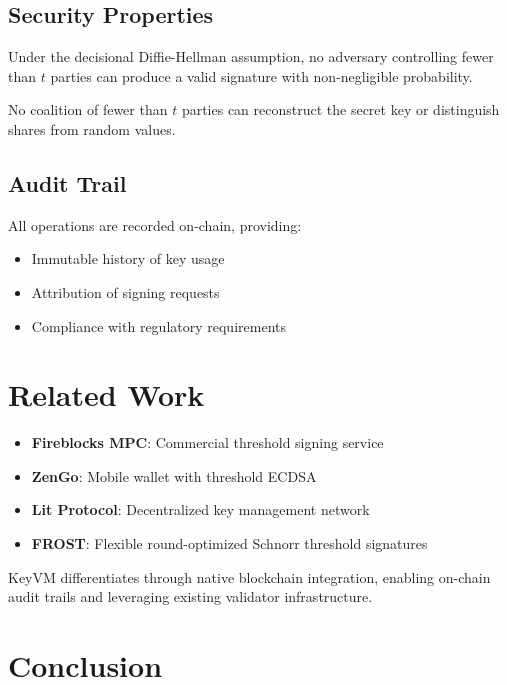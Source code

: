 \documentclass[11pt,twocolumn]{article}
\begin{document}
\subsection{Security Properties}

\begin{theorem}[Unforgeability]
Under the decisional Diffie-Hellman assumption, no adversary controlling fewer than $t$ parties can produce a valid signature with non-negligible probability.
\end{theorem}

\begin{theorem}
No coalition of fewer than $t$ parties can reconstruct the secret key or distinguish shares from random values.
\end{theorem}

\subsection{Audit Trail}

All operations are recorded on-chain, providing:

\begin{itemize}
\item Immutable history of key usage
\item Attribution of signing requests
\item Compliance with regulatory requirements
\end{itemize}

\section{Related Work}

\begin{itemize}
\item \textbf{Fireblocks MPC}: Commercial threshold signing service
\item \textbf{ZenGo}: Mobile wallet with threshold ECDSA
\item \textbf{Lit Protocol}: Decentralized key management network
\item \textbf{FROST}: Flexible round-optimized Schnorr threshold signatures
\end{itemize}

KeyVM differentiates through native blockchain integration, enabling on-chain audit trails and leveraging existing validator infrastructure.

\section{Conclusion}
\end{document}
